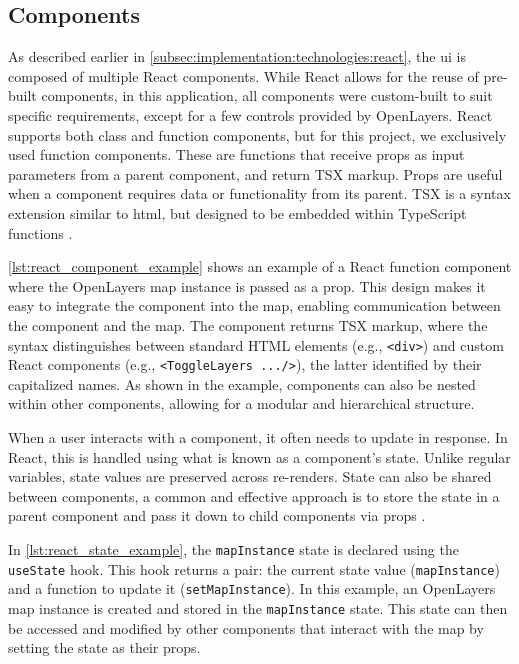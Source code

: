 \subsection{Components}

As described earlier in \autoref{subsec:implementation:technologies:react}, the \acrshort{ui} is composed of multiple React components. While React allows for the reuse of pre-built components, in this application, all components were custom-built to suit specific requirements, except for a few controls provided by OpenLayers. React supports both class and function components, but for this project, we exclusively used function components. These are functions that receive props as input parameters from a parent component, and return TSX markup. Props are useful when a component requires data or functionality from its parent. TSX is a syntax extension similar to \acrshort{html}, but designed to be embedded within TypeScript functions \cite{react_component}.

\autoref{lst:react_component_example} shows an example of a React function component where the OpenLayers map instance is passed as a prop. This design makes it easy to integrate the component into the map, enabling communication between the component and the map. The component returns TSX markup, where the syntax distinguishes between standard HTML elements (e.g., \texttt{<div>}) and custom React components (e.g., \texttt{<ToggleLayers .../>}), the latter identified by their capitalized names. As shown in the example, components can also be nested within other components, allowing for a modular and hierarchical structure.

\begin{figure}[h]

\end{figure}

When a user interacts with a component, it often needs to update in response. In React, this is handled using what is known as a component's state. Unlike regular variables, state values are preserved across re-renders. State can also be shared between components, a common and effective approach is to store the state in a parent component and pass it down to child components via props \cite{react_state}.

In \autoref{lst:react_state_example}, the \texttt{mapInstance} state is declared using the \texttt{useState} hook. This hook returns a pair: the current state value (\texttt{mapInstance}) and a function to update it (\texttt{setMapInstance}). In this example, an OpenLayers map instance is created and stored in the \texttt{mapInstance} state. This state can then be accessed and modified by other components that interact with the map by setting the state as their props.

